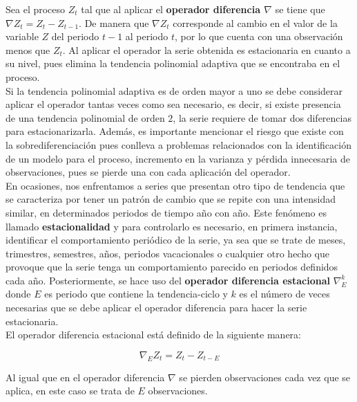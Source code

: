 Sea el proceso $Z_t$ tal que al aplicar el \textbf{operador diferencia $\nabla$ } se tiene que  $\nabla Z_t=Z_t-Z_{t-1}$. De manera que $\nabla Z_t$ corresponde al cambio en el valor de la variable $Z$ del periodo $t-1$ al periodo $t$, por lo que cuenta con una observación menos que $Z_t$. Al aplicar el operador la serie obtenida es estacionaria en cuanto a su nivel, pues elimina la tendencia polinomial adaptiva que se encontraba en el proceso. \\

Si la tendencia polinomial adaptiva es de orden mayor a uno se debe considerar aplicar el operador tantas veces como sea necesario, es decir, si existe presencia de una tendencia polinomial de orden $2$, la serie requiere de tomar dos diferencias para estacionarizarla. Además, es importante mencionar el riesgo que existe con la sobrediferenciación pues conlleva a problemas relacionados con la identificación de un modelo para el proceso, incremento en la varianza y p\'erdida innecesaria de observaciones, pues se pierde una con cada aplicación del operador.\\

En ocasiones, nos enfrentamos a series que presentan otro tipo de tendencia que se caracteriza por tener un patrón de cambio que se repite con una intensidad similar, en determinados periodos de tiempo a\~no con a\~no. Este fenómeno es llamado \textbf{estacionalidad} y para controlarlo es necesario, en primera instancia, identificar el comportamiento periódico de la serie, ya sea que se trate de meses, trimestres, semestres, años, periodos vacacionales o cualquier otro hecho que provoque que la serie tenga un comportamiento parecido  en periodos definidos cada a\~no. Posteriormente, se hace uso del \textbf{ operador diferencia estacional}  $\nabla_{E}^{k}$  donde $E$ es periodo que contiene la tendencia-ciclo y $k$ es el número de veces necesarias que se debe aplicar el operador diferencia para hacer la serie estacionaria.\\

El operador diferencia estacional está definido de la siguiente manera:

\begin{equation}
\nabla_{E} Z_t=Z_t-Z_{t-E}
\end {equation}

Al igual que en el operador diferencia $\nabla$ se pierden observaciones cada vez que se aplica, en este caso se trata de $E$ observaciones.\\

